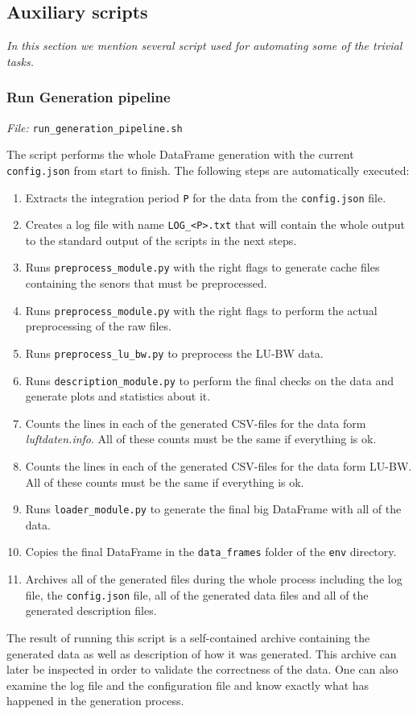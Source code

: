 \documentclass[12pt,a4paper,twoside]{scrartcl}
\numberwithin{equation}{section}
\begin{document}
\subsection{Auxiliary scripts}\label{sec:aux-scripts}
\noindent\emph{In this section we mention several script used for automating some of the trivial tasks.} 
\subsubsection{Run Generation pipeline}\label{sec:gen-pipe}
\noindent\emph{File: }\texttt{run\_generation\_pipeline.sh}

The script performs the whole DataFrame generation with the current \texttt{config.json} from start to finish. The following steps are automatically executed:
\begin{enumerate}
\item Extracts the integration period \texttt{P} for the data from the \texttt{config.json} file.\@
\item Creates a log file with name \texttt{LOG\_<P>.txt} that will contain the whole output to the standard output of the scripts in the next steps.\@
\item Runs \texttt{preprocess\_module.py} with the right flags to generate cache files containing the senors that must be preprocessed.\@
\item Runs \texttt{preprocess\_module.py} with the right flags to perform the actual preprocessing of the raw files.\@
\item Runs \texttt{preprocess\_lu\_bw.py} to preprocess the LU-BW data.\@
\item Runs \texttt{description\_module.py} to perform the final checks on the data and generate plots and statistics about it.\@
\item Counts the lines in each of the generated CSV-files for the data form \emph{luftdaten.info}. All of these counts must be the same if everything is ok.\@
\item Counts the lines in each of the generated CSV-files for the data form LU-BW. All of these counts must be the same if everything is ok.\@
\item Runs \texttt{loader\_module.py} to generate the final big DataFrame with all of the data.\@
\item Copies the final DataFrame in the \texttt{data\_frames} folder of the \texttt{env} directory.\@
\item Archives all of the generated files during the whole process including the log file, the \texttt{config.json} file, all of the generated data files and all of the generated description files.\@
\end{enumerate}
The result of running this script is a self-contained archive containing the generated data as well as description of how it was generated. This archive can later be inspected in order to validate the correctness of the data. One can also examine the log file and the configuration file and know exactly what has happened in the generation process.
\end{document}
